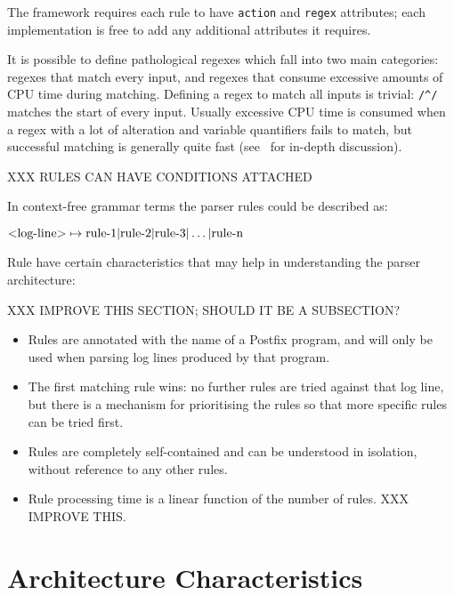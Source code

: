 The framework requires each rule to have \texttt{action} and \texttt{regex}
attributes; each implementation is free to add any additional attributes it
requires.

It is possible to define pathological regexes which fall into two main
categories: regexes that match every input, and regexes that consume
excessive amounts of CPU time during matching.  Defining a regex to match
all inputs is trivial: \verb!/^/! matches the start of every input.
Usually excessive CPU time is consumed when a regex with a lot of
alteration and variable quantifiers fails to match, but successful
matching is generally quite fast (see~\cite{mastering-regular-expressions}
for in-depth discussion).

XXX RULES CAN HAVE CONDITIONS ATTACHED

\label{comparison against context-free grammars}

In context-free grammar terms the parser rules could be described as:

$\text{\textless{}log-line\textgreater{}} \mapsto \text{rule-1} |
\text{rule-2} | \text{rule-3} | \dots | \text{rule-n}$


Rule have certain characteristics that may help in understanding the
parser architecture:

XXX IMPROVE THIS SECTION\@; SHOULD IT BE A SUBSECTION\@?

\begin{itemize}

    \item Rules are annotated with the name of a Postfix program, and will
        only be used when parsing log lines produced by that
        program.

    \item The first matching rule wins: no further rules are tried against
        that log line, but there is a mechanism for prioritising the rules
        so that more specific rules can be tried first.

    \item Rules are completely self-contained and can be understood in
        isolation, without reference to any other rules.

    \item Rule processing time is a linear function of the number of rules.
        XXX IMPROVE THIS\@.

\end{itemize}

\section{Architecture Characteristics}

